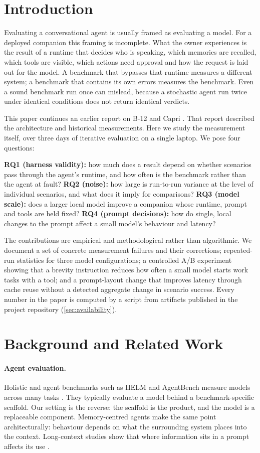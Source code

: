 \documentclass[11pt,a4paper]{article}
\begin{document}
\section{Introduction}
Evaluating a conversational agent is usually framed as evaluating a model. For a deployed companion this framing is incomplete. What the owner experiences is the result of a runtime that decides who is speaking, which memories are recalled, which tools are visible, which actions need approval and how the request is laid out for the model. A benchmark that bypasses that runtime measures a different system; a benchmark that contains its own errors measures the benchmark. Even a sound benchmark run once can mislead, because a stochastic agent run twice under identical conditions does not return identical verdicts.

This paper continues an earlier report on B-12 and Capri \cite{capriprev,b12}. That report described the architecture and historical measurements. Here we study the measurement itself, over three days of iterative evaluation on a single laptop. We pose four questions:

\textbf{RQ1 (harness validity):} how much does a result depend on whether scenarios pass through the agent's runtime, and how often is the benchmark rather than the agent at fault?
\textbf{RQ2 (noise):} how large is run-to-run variance at the level of individual scenarios, and what does it imply for comparisons?
\textbf{RQ3 (model scale):} does a larger local model improve a companion whose runtime, prompt and tools are held fixed?
\textbf{RQ4 (prompt decisions):} how do single, local changes to the prompt affect a small model's behaviour and latency?

The contributions are empirical and methodological rather than algorithmic. We document a set of concrete measurement failures and their corrections; repeated-run statistics for three model configurations; a controlled A/B experiment showing that a brevity instruction reduces how often a small model starts work tasks with a tool; and a prompt-layout change that improves latency through cache reuse without a detected aggregate change in scenario success. Every number in the paper is computed by a script from artifacts published in the project repository (\cref{sec:availability}).

\section{Background and Related Work}\label{sec:related}
\paragraph{Agent evaluation.} Holistic and agent benchmarks such as HELM and AgentBench measure models across many tasks \cite{helm,agentbench}. They typically evaluate a model behind a benchmark-specific scaffold. Our setting is the reverse: the scaffold is the product, and the model is a replaceable component. Memory-centred agents \cite{memgpt,generative} make the same point architecturally: behaviour depends on what the surrounding system places into the context. Long-context studies show that where information sits in a prompt affects its use \cite{lost}.
\end{document}
